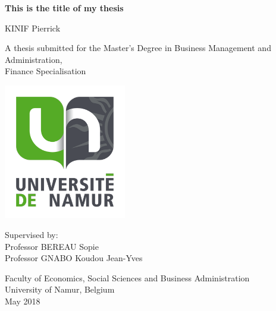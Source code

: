 \documentclass[12pt,]{article}
\title{}
\author{}
\date{}
\begin{document}

\begin{centering}

\vspace{2.5cm}

\Huge

{\bf This is the title of my thesis}

\vspace{1.5cm}

\Large
KINIF Pierrick

\vspace{1.5cm}


\normalsize
A thesis submitted for the Master's Degree in Business Management and Administration,\\
Finance Specialisation


\vspace{0.5cm}

\includegraphics[width=0.4\textwidth]{figures/UNamur.png}


\vspace{0.5cm}

\normalsize
Supervised by:\\
\vspace{0.5cm}
Professor BEREAU Sopie\\
Professor GNABO Koudou Jean-Yves

\vspace{1.5cm}



\vfill
\normalsize

Faculty of Economics, Social Sciences and Business Administration\\
University of Namur, Belgium\\
May 2018



\end{centering}

\newpage
\end{document}
